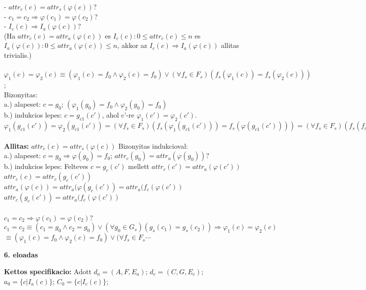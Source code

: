 \documentclass[a4paper,10pt]{article}
\begin{document}
- $attr_c(c) = attr_s(\varphi(c))$?\\
- $c_1 = c_2 \Rightarrow \varphi(c_1) = \varphi(c_2)$?\\
- $I_c(c) \Rightarrow I_a(\varphi(c))$?\\
(Ha $attr_c(c) = attr_a(\varphi(c))$ es $I_c(c): 0 \le attr_c(c)\le n$ es $I_a(\varphi(c)):0\le attr_a(\varphi(c))\le n$, akkor az $I_c(c) \Rightarrow I_a(\varphi(c))$ allitas trivialis.)\\ \\
$\varphi_1(c) = \varphi_2(c) \equiv (\varphi_1(c) = f_0 \wedge \varphi_2(c) = f_0) \vee (\forall f_s\in F_s)(f_s(\varphi_1(c)) = f_s(\varphi_2(c)))$;\\
Bizonyitas:\\
a.) alapeset: $c = g_0$; $(\varphi_1(g_0) = f_0 \wedge \varphi_2(g_0)=f_0)$\\
b.) indukcios lepes: $c=g_{c1}(c')$, ahol c'-re $\varphi_1(c')=\varphi_2(c')$.\\
\indent $\varphi_1(g_{c1}(c')) = \varphi_2(g_{c1}(c')) = (\forall f_s\in F_s) (f_s(\varphi_1(g_{c1}(c')))=f_s(\varphi(g_{c1}(c')))) = (\forall f_s\in F_s)(f_s(f_{c1}(\varphi_1(c')))=f_s(f_{c2}(\varphi_2(c'))))$\\ \\
\textbf{Allitas:} $attr_c(c) = attr_s(\varphi(c))$
Bizonyitas indukcioval:\\
a.) alapeset: $c=g_0 \Rightarrow \varphi(g_0)=f_0$; $attr_c(g_0) = attr_a(\varphi(g_0))$?\\
b.) indukcios lepes: Felteves $c=g_c(c')$ mellett $attr_c(c') = attr_a(\varphi(c'))$\\
$attr_c(c)=attr_c(g_c(c'))$\\
$attr_a(\varphi(c))=attr_a(\varphi(g_c(c')) = attr_a(f_c(\varphi(c'))$\\
$attr_c(g_c(c')) = attr_a(f_c(\varphi(c'))$\\ \\
$c_1=c_2 \Rightarrow \varphi(c_1) = \varphi(c_2)$?\\
$c_1=c_2 \equiv (c_1 = g_0 \wedge c_2=g_0) \vee (\forall g_0\in G_s)(g_s(c_1) = g_s(c_2)) \Rightarrow \varphi_1(c)=\varphi_2(c)$\\
$\equiv (\varphi_1(c)=f_0 \wedge \varphi_2(c)=f_0) \vee (\forall f_s\in F_s\cdots$
\newpage
%
%
\begin{flushleft}
\textbf{6. eloadas}
\end{flushleft}
\textbf{Kettos specifikacio:} Adott $d_a=(A, F, E_a)$; $d_c = (C, G, E_c)$; $a_0=\lbrace c\vert I_a(c)\rbrace$; $C_0 = \lbrace c\vert I_c(c)\rbrace$;\\
\end{document}
